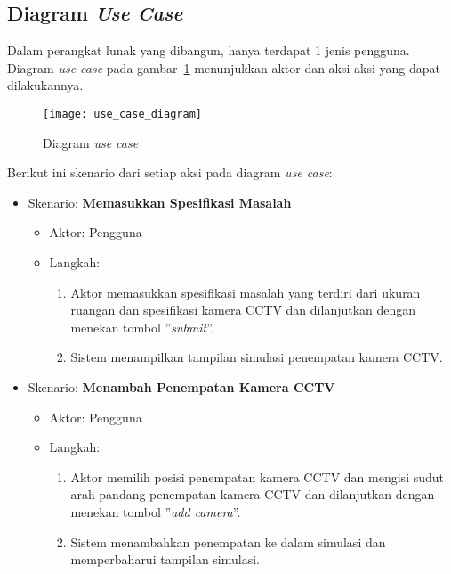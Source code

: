 \subsection{Diagram \textit{Use Case}}
Dalam perangkat lunak yang dibangun, hanya terdapat 1 jenis pengguna. Diagram \textit{use case} pada gambar~\ref{fig:use_case_diagram} menunjukkan aktor dan aksi-aksi yang dapat dilakukannya.
\begin{figure}[h]
	\centering  
	\texttt{[image: use\_case\_diagram]}
	\caption[Diagram \textit{use case}]{Diagram \textit{use case}}
	\label{fig:use_case_diagram}
\end{figure}

Berikut ini skenario dari setiap aksi pada diagram \textit{use case}:
\begin{itemize}
	\item Skenario: \textbf{Memasukkan Spesifikasi Masalah}
	\begin{itemize}
		\item Aktor: Pengguna
		\item Langkah:
		\begin{enumerate}
			\item Aktor memasukkan spesifikasi masalah yang terdiri dari ukuran ruangan dan spesifikasi kamera CCTV dan dilanjutkan dengan menekan tombol ''\textit{submit}''.
			\item Sistem menampilkan tampilan simulasi penempatan kamera CCTV.
		\end{enumerate}
	\end{itemize}
	\item Skenario: \textbf{Menambah Penempatan Kamera CCTV}
	\begin{itemize}
		\item Aktor: Pengguna
		\item Langkah:
		\begin{enumerate}
			\item Aktor memilih posisi penempatan kamera CCTV dan mengisi sudut arah pandang penempatan kamera CCTV dan dilanjutkan dengan menekan tombol ''\textit{add camera}''.
			\item Sistem menambahkan penempatan ke dalam simulasi dan memperbaharui tampilan simulasi.
		\end{enumerate}
	\end{itemize}

\end{itemize}
